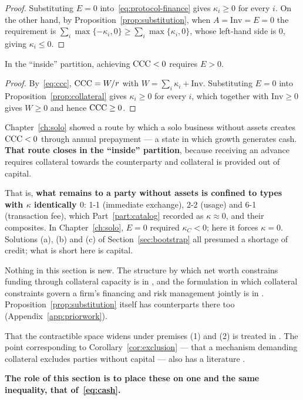 \begin{proof}
Substituting $E=0$ into~\eqref{eq:protocol-finance} gives $\kappa_i\geq 0$ for every $i$.
On the other hand, by Proposition~\ref{prop:substitution}, when $A=\mathrm{Inv}=E=0$ the
requirement is $\sum_i\max\{-\kappa_i,0\}\geq\sum_i\max\{\kappa_i,0\}$, whose left-hand side
is $0$, giving $\kappa_i\leq 0$.
\end{proof}

\begin{corollary}
\label{cor:growth-needs-capital}
In the ``inside'' partition, achieving $\mathrm{CCC}<0$ requires $E>0$.
\end{corollary}

\begin{proof}
By~\eqref{eq:ccc}, $\mathrm{CCC}=W/r$ with $W=\sum_i\kappa_i+\mathrm{Inv}$. Substituting $E=0$ into
Proposition~\ref{prop:collateral} gives $\kappa_i\geq 0$ for every $i$, which together with
$\mathrm{Inv}\geq 0$ gives $W\geq 0$ and hence $\mathrm{CCC}\geq 0$.
\end{proof}

Chapter~\ref{ch:solo} showed a route by which a solo business without assets creates
$\mathrm{CCC}<0$ through annual prepayment --- a state in which growth generates cash.
\textbf{That route closes in the ``inside'' partition}, because receiving an advance requires
collateral towards the counterparty and collateral is provided out of capital.

That is, \textbf{what remains to a party without assets is confined to types with $\kappa$
identically $0$}: 1-1 (immediate exchange), 2-2 (usage) and 6-1 (transaction fee), which
Part~\ref{part:catalog} recorded as $\kappa\approx 0$, and their composites.
In Chapter~\ref{ch:solo}, $E=0$ required $\kappa_C<0$; here it forces $\kappa=0$.
Solutions (a), (b) and (c) of Section~\ref{sec:bootstrap} all presumed a shortage of credit;
what is short here is capital.

\begin{remark}
\label{rem:collateral-priorwork}
Nothing in this section is new. The structure by which net worth constrains funding through
collateral capacity is in \cite{kiyotaki1997}, and the formulation in which collateral
constraints govern a firm's financing and risk management jointly is in
\cite{rampini2010,rampini2013}. Proposition~\ref{prop:substitution} itself has counterparts
there too (Appendix~\ref{app:priorwork}).

That the contractible space widens under premises (1) and (2) is treated in \cite{cong2019}.
The point corresponding to Corollary~\ref{cor:exclusion} --- that a mechanism demanding
collateral excludes parties without capital --- also has a literature \cite{oecd2024}.

\textbf{The role of this section is to place these on one and the same inequality,
that of~\eqref{eq:cash}.}
\end{remark}

